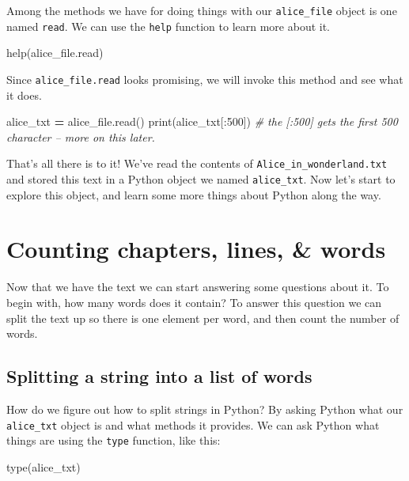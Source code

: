 \documentclass[]{book}
\newenvironment{Shaded}{\begin{snugshade}}{\end{snugshade}}
\newcommand{\DecValTok}[1]{\textcolor[rgb]{0.00,0.00,0.81}{#1}}
\newcommand{\CommentTok}[1]{\textcolor[rgb]{0.56,0.35,0.01}{\textit{#1}}}
\newcommand{\OperatorTok}[1]{\textcolor[rgb]{0.81,0.36,0.00}{\textbf{#1}}}
\newcommand{\BuiltInTok}[1]{#1}
\newcommand{\NormalTok}[1]{#1}
\begin{document}
Among the methods we have for doing things with our \texttt{alice\_file}
object is one named \texttt{read}. We can use the \texttt{help} function
to learn more about it.

\begin{Shaded}
\begin{Highlighting}[]
\BuiltInTok{help}\NormalTok{(alice_file.read)}
\end{Highlighting}
\end{Shaded}

Since \texttt{alice\_file.read} looks promising, we will invoke this
method and see what it does.

\begin{Shaded}
\begin{Highlighting}[]
\NormalTok{alice_txt }\OperatorTok{=}\NormalTok{ alice_file.read()}
\BuiltInTok{print}\NormalTok{(alice_txt[:}\DecValTok{500}\NormalTok{]) }\CommentTok{# the [:500] gets the first 500 character -- more on this later.}
\end{Highlighting}
\end{Shaded}

That's all there is to it! We've read the contents of
\texttt{Alice\_in\_wonderland.txt} and stored this text in a Python
object we named \texttt{alice\_txt}. Now let's start to explore this
object, and learn some more things about Python along the way.

\section{Counting chapters, lines, \&
words}\label{counting-chapters-lines-words}

Now that we have the text we can start answering some questions about
it. To begin with, how many words does it contain? To answer this
question we can split the text up so there is one element per word, and
then count the number of words.

\subsection{Splitting a string into a list of
words}\label{splitting-a-string-into-a-list-of-words}

How do we figure out how to split strings in Python? By asking Python
what our \texttt{alice\_txt} object is and what methods it provides. We
can ask Python what things are using the \texttt{type} function, like
this:

\begin{Shaded}
\begin{Highlighting}[]
\BuiltInTok{type}\NormalTok{(alice_txt)}
\end{Highlighting}
\end{Shaded}
\end{document}
